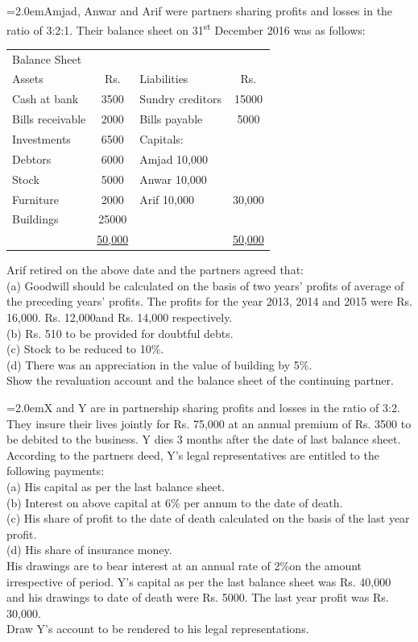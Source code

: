 \documentclass[11pt,a4paper]{article}
\newcommand{\lqn}[2]{\Needspace{6\baselineskip}\par\medskip\noindent\hangindent=2.0em\hangafter=1\makebox[2.0em][l]{\textbf{#1.}}#2\par}
\begin{document}
\lqn{103}{Amjad, Anwar and Arif were partners sharing profits and losses in the ratio of 3:2:1. Their balance sheet on 31\textsuperscript{st}  December 2016 was as follows:\par
\par\smallskip\noindent\hspace*{1.2em}\begin{tabular}{|lclc|}
\hline
Balance Sheet &  &  &  \\
Assets & Rs. & Liabilities & Rs. \\
Cash at bank & 3500 & Sundry creditors & 15000 \\
Bills receivable & 2000 & Bills payable & 5000 \\
Investments & 6500 & Capitals: &  \\
Debtors & 6000 & Amjad          10,000 &  \\
Stock & 5000 & Anwar          10,000 &  \\
Furniture & 2000 & Arif               10,000 & 30,000 \\
Buildings & 25000 &  &  \\
 & \underline{50,000} &  & \underline{50,000} \\
\hline
\end{tabular}\par\smallskip
Arif retired on the above date and the partners agreed that:\\
(a) Goodwill should be calculated on the basis of two years’ profits of average of the preceding years’ profits. The profits for the year 2013, 2014 and 2015 were Rs. 16,000. Rs. 12,000and Rs. 14,000 respectively.\\
(b) Rs. 510 to be provided for doubtful debts.\\
(c) Stock to be reduced to 10\%.\\
(d) There was an appreciation in the value of building by 5\%.\\
Show the revaluation account and the balance sheet of the continuing partner.\par
}
\lqn{104}{X and Y are in partnership sharing profits and losses in the ratio of 3:2. They insure their lives jointly for Rs. 75,000 at an annual premium of Rs. 3500 to be debited to the business. Y dies 3 months after the date of last balance sheet. According to the partners deed, Y’s legal representatives are entitled to the following payments:\\
(a) His capital as per the last balance sheet.\\
(b) Interest on above capital at 6\% per annum to the date of death.\\
(c) His share of profit to the date of death calculated on the basis of the last year profit.\\
(d) His share of insurance money.\\
His drawings are to bear interest at an annual rate of 2\%on the amount irrespective of period. Y's capital as per the last balance sheet was Rs. 40,000 and his drawings to date of death were Rs. 5000. The last year profit was Rs. 30,000.\\
Draw Y’s account to be rendered to his legal representations.\par
}
\end{document}
